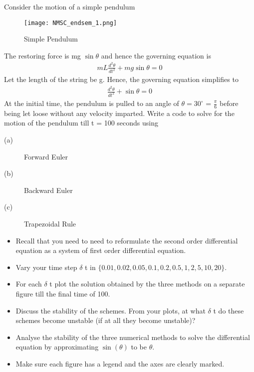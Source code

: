 \documentclass[letterpaper]{exam}
\begin{document}
\begin{questions}
\begin{solution}
\end{solution}
\question [20] Consider the motion of a simple pendulum
\begin{figure}[H]  
     \centering
    \texttt{[image: NMSC\_endsem\_1.png]}
     \label{fig:Dendrogram for the problem 3(c)}
     \caption{Simple Pendulum}
\end{figure}
The restoring force is mg $\sin{\theta}$ and hence the governing equation is
\begin{align*}
    mL \frac{d^2 \theta}{dt^2} + mg\sin{\theta} = 0
\end{align*}
Let the length of the string be g. Hence, the governing equation simplifies to
\begin{align*}
    \frac{d^2 \theta}{dt^2} + \sin{\theta} = 0
\end{align*}
At the initial time, the pendulum is pulled to an angle of $\theta = 30^{\circ}$ = $\frac{\pi}{6}$ before being let loose without any
velocity imparted. Write a code to solve for the motion of the pendulum till t = 100 seconds using
\begin{description}
    \item[(a)] Forward Euler
    \item[(b)] Backward Euler
    \item[(c)] Trapezoidal Rule
\end{description}
\begin{itemize}
    \item Recall that you need to need to reformulate the second order differential equation as a system of first order differential equation.
    \item  Vary your time step $\delta$ t in $\{0.01, 0.02, 0.05, 0.1, 0.2, 0.5, 1, 2, 5, 10, 20\}$.
    \item For each $\delta$ t plot the solution obtained by the three methods on a separate figure till the final time of 100.
    \item Discuss the stability of the schemes. From your plots, at what $\delta $ t do these schemes become unstable (if at all they become unstable)?
    \item Analyse the stability of the three numerical methods to solve the differential equation by approximating $\sin{(\theta)}$ to be $\theta$.
    \item  Make sure each figure has a legend and the axes are clearly marked.

\end{itemize}
\end{questions}
\end{document}
